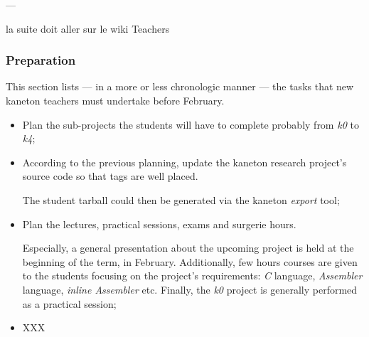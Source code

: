 ---

la suite doit aller sur le wiki Teachers


\subsubsection{Preparation}

This section lists --- in a more or less chronologic manner --- the tasks that
new kaneton teachers must undertake before February.

\begin{itemize}
  \item
    Plan the sub-projects the students will have to complete probably from
    \textit{k0} to \textit{k4};
  \item
    According to the previous planning, update the kaneton research project's
    source code so that tags are well placed.

    \-

    The student tarball could then be generated via the kaneton
    \textit{export} tool;
  \item
    Plan the lectures, practical sessions, exams and surgerie hours.

    \-

    Especially, a general presentation about the upcoming project is held
    at the beginning of the term, in February. Additionally, few hours courses
    are given to the students focusing on the project's requirements:
    \textit{C} language, \textit{Assembler} language, \textit{inline Assembler}
    etc. Finally, the \textit{k0} project is generally performed as a practical
    session;
  \item
    XXX
\end{itemize}

